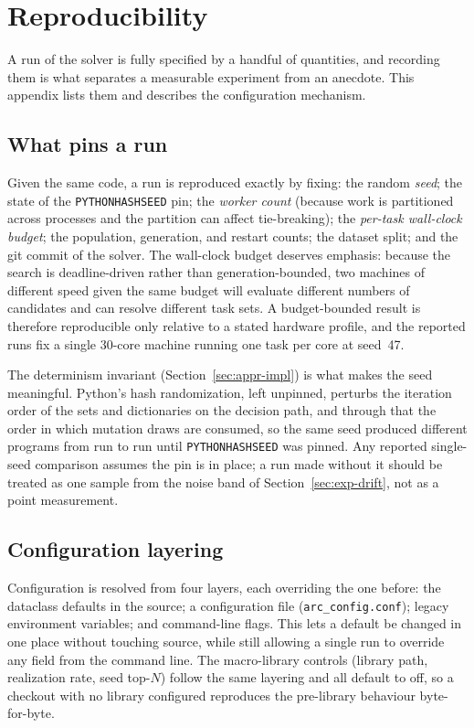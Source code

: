 \chapter{Reproducibility}
\label{app:repro}

A run of the solver is fully specified by a handful of quantities, and recording them is
what separates a measurable experiment from an anecdote. This appendix lists them and
describes the configuration mechanism.

\section{What pins a run}
\label{app:repro-pin}

Given the same code, a run is reproduced exactly by fixing: the random \emph{seed}; the
state of the \texttt{PYTHONHASHSEED} pin; the \emph{worker count} (because work is
partitioned across processes and the partition can affect tie-breaking); the \emph{per-task
wall-clock budget}; the population, generation, and restart counts; the dataset split; and
the git commit of the solver. The wall-clock budget deserves emphasis: because the search
is deadline-driven rather than generation-bounded, two machines of different speed given
the same budget will evaluate different numbers of candidates and can resolve different
task sets. A budget-bounded result is therefore reproducible only relative to a stated
hardware profile, and the reported runs fix a single 30-core machine running one task per
core at seed~47.

The determinism invariant (Section~\ref{sec:appr-impl}) is what makes the seed meaningful.
Python's hash randomization, left unpinned, perturbs the iteration order of the sets and
dictionaries on the decision path, and through that the order in which mutation draws are
consumed, so the same seed produced different programs from run to run until
\texttt{PYTHONHASHSEED} was pinned. Any reported single-seed comparison assumes the pin is
in place; a run made without it should be treated as one sample from the noise band of
Section~\ref{sec:exp-drift}, not as a point measurement.

\section{Configuration layering}
\label{app:repro-config}

Configuration is resolved from four layers, each overriding the one before: the dataclass
defaults in the source; a configuration file (\texttt{arc\_config.conf}); legacy
environment variables; and command-line flags. This lets a default be changed in one place
without touching source, while still allowing a single run to override any field from the
command line. The macro-library controls (library path, realization rate, seed
top-$N$) follow the same layering and all default to off, so a checkout with no library
configured reproduces the pre-library behaviour byte-for-byte.

